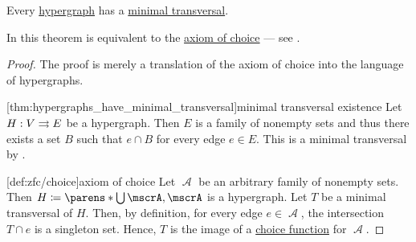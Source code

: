 \begin{theorem}\label{thm:hypergraphs_have_minimal_transversal}
  Every \hyperref[def:hypergraph]{hypergraph} has a \hyperref[def:hypergraph_minimal_transversal]{minimal transversal}.

  In \hyperref[def:zfc]{} this theorem is equivalent to the \hyperref[def:zfc/choice]{axiom of choice} --- see .
\end{theorem}
\begin{proof}
  The proof is merely a translation of the axiom of choice into the language of hypergraphs.

  [thm:hypergraphs_have_minimal_transversal]{minimal transversal existence} Let \( H: V \rightrightarrows E \) be a hypergraph. Then \( E \) is a family of nonempty sets and thus there exists a set \( B \) such that \( e \cap B \) for every edge \( e \in E \). This is a minimal transversal by .

  [def:zfc/choice]{axiom of choice} Let \( \mscrA \) be an arbitrary family of nonempty sets. Then \( H \coloneqq \parens*{ \bigcup \mscrA, \mscrA } \) is a hypergraph. Let \( T \) be a minimal transversal of \( H \). Then, by definition, for every edge \( e \in \mscrA \), the intersection \( T \cap e \) is a singleton set. Hence, \( T \) is the image of a \hyperref[def:choice_function]{choice function} for \( \mscrA \).
\end{proof}
